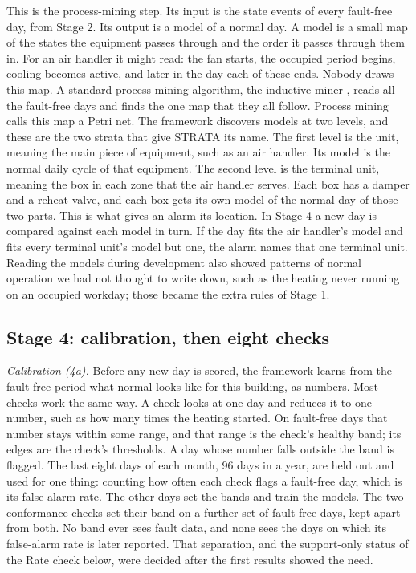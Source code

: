 \documentclass[conference]{IEEEtran}
\begin{document}
This is the process-mining step. Its input is the state events of every fault-free day, from Stage 2. Its output is a model of a normal day. A model is a small map of the states the equipment passes through and the order it passes through them in. For an air handler it might read: the fan starts, the occupied period begins, cooling becomes active, and later in the day each of these ends. Nobody draws this map. A standard process-mining algorithm, the inductive miner \cite{leemans2013inductiveminer}, reads all the fault-free days and finds the one map that they all follow. Process mining calls this map a Petri net. The framework discovers models at two levels, and these are the two strata that give STRATA its name. The first level is the unit, meaning the main piece of equipment, such as an air handler. Its model is the normal daily cycle of that equipment. The second level is the terminal unit, meaning the box in each zone that the air handler serves. Each box has a damper and a reheat valve, and each box gets its own model of the normal day of those two parts. This is what gives an alarm its location. In Stage 4 a new day is compared against each model in turn. If the day fits the air handler's model and fits every terminal unit's model but one, the alarm names that one terminal unit. Reading the models during development also showed patterns of normal operation we had not thought to write down, such as the heating never running on an occupied workday; those became the extra rules of Stage 1.

\subsection{Stage 4: calibration, then eight checks}

\emph{Calibration (4a).} Before any new day is scored, the framework learns from the fault-free period what normal looks like for this building, as numbers. Most checks work the same way. A check looks at one day and reduces it to one number, such as how many times the heating started. On fault-free days that number stays within some range, and that range is the check's healthy band; its edges are the check's thresholds. A day whose number falls outside the band is flagged. The last eight days of each month, 96 days in a year, are held out and used for one thing: counting how often each check flags a fault-free day, which is its false-alarm rate. The other days set the bands and train the models. The two conformance checks set their band on a further set of fault-free days, kept apart from both. No band ever sees fault data, and none sees the days on which its false-alarm rate is later reported. That separation, and the support-only status of the Rate check below, were decided after the first results showed the need.
\end{document}
